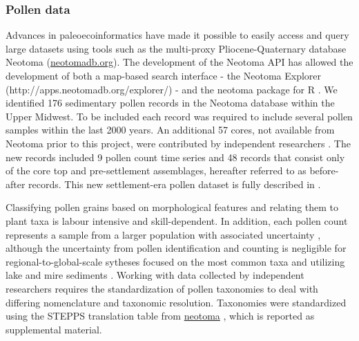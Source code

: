 \documentclass[12pt]{article}
\begin{document}


\subsubsection{Pollen data}

Advances in paleoecoinformatics \citep{brewer2012paleoecoinformatics,
  grimm2013encyclopedia} have made it possible to easily access and
query large datasets using tools such as the multi-proxy
Pliocene-Quaternary database Neotoma (\url{neotomadb.org}). The
development of the Neotoma API has allowed the development of both a
map-based search interface - the Neotoma Explorer
(http://apps.neotomadb.org/explorer/) - and the neotoma package for R
\citep{goring2015}. We identified 176 sedimentary pollen records in
the Neotoma database within the Upper Midwest. To be included each
record was required to include several pollen samples within the last
2000 years.  An additional 57 cores, not available from Neotoma prior
to this project, were contributed by independent researchers
\citep{kujawa2015}. The new records included 9 pollen count time
series and 48 records that consist only of the core top and
pre-settlement assemblages, hereafter referred to as before-after
records. This new settlement-era pollen dataset is fully described in
\citet{kujawa2015}.

Classifying pollen grains based on morphological features and relating
them to plant taxa is labour intensive and skill-dependent. In
addition, each pollen count represents a sample from a larger
population with associated uncertainty \citep{maher2012assessment,
  maher1981statistics}, although the uncertainty from pollen
identification and counting is negligible for regional-to-global-scale
sytheses focused on the most common taxa and utilizing lake and mire
sediments \citep{webb1978sensing, webb1978mapped}. Working with data
collected by independent researchers requires the standardization of
pollen taxonomies to deal with differing nomenclature and taxonomic
resolution. Taxonomies were standardized using the STEPPS translation
table from \url{neotoma} \citep{goring}, which is reported as
supplemental material.
\end{document}

